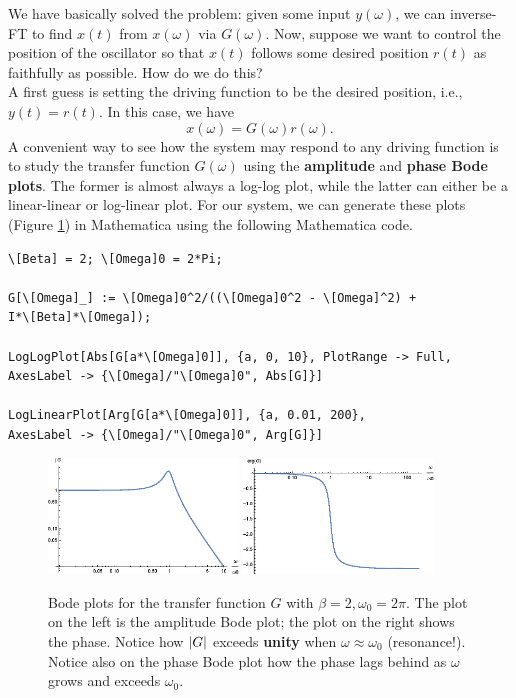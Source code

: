 \documentclass{article}
\theoremstyle{definition}
\begin{document}
We have basically solved the problem: given some input $y(\omega)$, we can inverse-FT to find $x(t)$ from $x(\omega)$ via $G(\omega)$. Now, suppose we want to control the position of the oscillator so that $x(t)$ follows some desired position $r(t)$ as faithfully as possible. How do we do this? \\


A first guess is setting the driving function to be the desired position, i.e., $y(t) = r(t)$. In this case, we have 
\begin{equation*}
x(\omega) = G(\omega) r(\omega).
\end{equation*}
A convenient way to see how the system may respond to any driving function is to study the transfer function $G(\omega)$ using the \textbf{amplitude} and \textbf{phase Bode plots}. The former is almost always a log-log plot, while the latter can either be a linear-linear or log-linear plot. For our system, we can generate these plots (Figure \ref{fig:bode_1}) in Mathematica using the following Mathematica code. 

\begin{lstlisting}
\[Beta] = 2; \[Omega]0 = 2*Pi;

G[\[Omega]_] := \[Omega]0^2/((\[Omega]0^2 - \[Omega]^2) + 
I*\[Beta]*\[Omega]);

LogLogPlot[Abs[G[a*\[Omega]0]], {a, 0, 10}, PlotRange -> Full, 
AxesLabel -> {\[Omega]/"\[Omega]0", Abs[G]}]

LogLinearPlot[Arg[G[a*\[Omega]0]], {a, 0.01, 200}, 
AxesLabel -> {\[Omega]/"\[Omega]0", Arg[G]}]
\end{lstlisting}


\begin{figure}
	\centering
	\includegraphics[width=0.45\textwidth]{bode_1}
	\quad
	\includegraphics[width=0.45\textwidth]{bode_2}
	\caption{Bode plots for the transfer function $G$ with $\beta = 2,\omega_0 = 2\pi$. The plot on the left is the amplitude Bode plot; the plot on the right shows the phase. Notice how $\abs{G}$ exceeds \textbf{unity} when $\omega \approx \omega_0$ (resonance!). Notice also on the phase Bode plot how the phase lags behind as $\omega$ grows and exceeds $\omega_0$.}%
	\label{fig:bode_1}
\end{figure}
\end{document}
